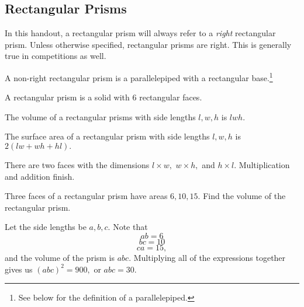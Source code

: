 \documentclass[mast]{lucky}
\begin{document}
\subsection{Rectangular Prisms}

In this handout, a rectangular prism will always refer to a \textit{right} rectangular prism. Unless otherwise specified, rectangular prisms are right. This is generally true in competitions as well.

A non-right rectangular prism is a parallelepiped with a rectangular base.\footnote{See below for the definition of a parallelepiped.}

\begin{defi}
A rectangular prism is a solid with $6$ rectangular faces.
\end{defi}

\begin{theo}
The volume of a rectangular prisms with side lengths $l,w,h$ is $lwh.$
\end{theo}

\begin{theo}
The surface area of a rectangular prism with side lengths $l,w,h$ is $2(lw+wh+hl).$
\end{theo}

\begin{pro}
There are two faces with the dimensions $l\times w,$ $w\times h,$ and $h\times l.$ Multiplication and addition finish.
\end{pro}

\begin{center}
\end{center}

\begin{exam}
Three faces of a rectangular prism have areas $6,10,15.$ Find the volume of the rectangular prism.
\end{exam}
\begin{sol}
Let the side lengths be $a,b,c.$ Note that
\[ab=6\]
\[bc=10\]
\[ca=15,\]
and the volume of the prism is $abc.$ Multiplying all of the expressions together gives us $(abc)^2=900,$ or $abc=30.$
\end{sol}
\end{document}
